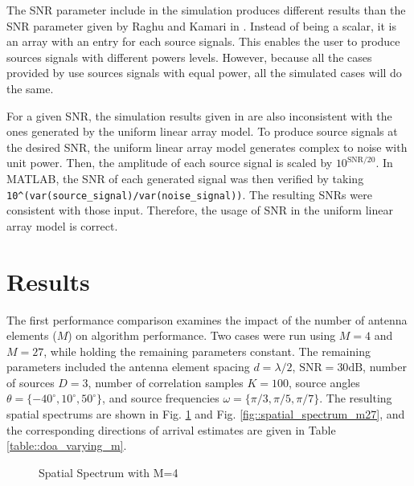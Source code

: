 \documentclass[conference]{IEEEtran}
\begin{document}
		The SNR parameter include in the simulation produces different results than the SNR parameter given by Raghu and Kamari in \cite{doa_algorithms_raghu}. Instead of being a scalar, it is an array with an entry for each source signals. This enables the user to produce sources signals with different powers levels. However, because all the cases provided by \cite{doa_algorithms_raghu} use sources signals with equal power, all the simulated cases will do the same.
		
		For a given SNR, the simulation results given in \cite{doa_algorithms_raghu} are also inconsistent with the ones generated by the uniform linear array model. To produce source signals at the desired SNR, the uniform linear array model generates complex to noise with unit power. Then, the amplitude of each source signal is scaled by $10^{\text{SNR}/20}$. In MATLAB, the SNR of each generated signal was then verified by taking \texttt{10\^{}(var(source\_signal)/var(noise\_signal))}. The resulting SNRs were consistent with those input. Therefore, the usage of SNR in the uniform linear array model is correct. %
		
		
	\section{Results}
	
		The first performance comparison examines the impact of the number of antenna elements ($M$) on algorithm performance. Two cases were run using $M = 4$ and $M=27$, while holding the remaining parameters constant. The remaining parameters included the antenna element spacing $d = \lambda/2$, $\text{SNR}=30\text{dB}$, number of sources $D=3$, number of correlation samples $K=100$, source angles $\theta = \{-40^{\circ}, 10^{\circ}, 50^{\circ}\}$, and source frequencies $\omega = \{\pi/3, \pi/5, \pi/7\}$. The resulting spatial spectrums are shown in Fig. \ref{fig::spatial_spectrum_m4} and Fig. \ref{fig::spatial_spectrum_m27}, and the corresponding directions of arrival estimates are given in Table \ref{table::doa_varying_m}.
		
		\begin{figure}[H]
			\centerline{}
			\caption{Spatial Spectrum with M=4}			
			\label{fig::spatial_spectrum_m4}
		\end{figure}
		
\end{document}
